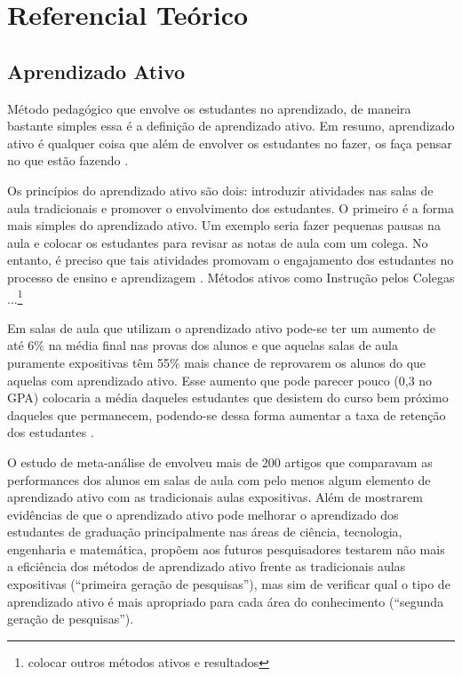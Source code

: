 \chapter{Referencial Teórico}

\section{Aprendizado Ativo}
Método pedagógico que envolve os estudantes no aprendizado, de maneira bastante simples
essa é a definição de aprendizado ativo. Em resumo, aprendizado ativo é qualquer coisa
que além de envolver os estudantes no fazer, os faça pensar no que estão fazendo \cite[p. 19]{Charles1991}.

Os princípios do aprendizado ativo são dois: introduzir atividades nas salas de aula
tradicionais e promover o envolvimento dos estudantes. O primeiro é a forma
mais simples do aprendizado ativo. Um exemplo seria fazer pequenas pausas na aula
e colocar os estudantes para revisar as notas de aula com um colega. No entanto,
é preciso que tais atividades promovam o engajamento dos estudantes no processo
de ensino e aprendizagem \cite[p. 3]{Prince2004}. Métodos ativos como Instrução
pelos Colegas \cite{} ...\footnote{colocar outros métodos ativos e resultados}

Em salas de aula que utilizam o aprendizado ativo pode-se ter um aumento de até 6\%
na média final nas provas dos alunos e que aquelas salas de aula puramente expositivas
têm 55\% mais chance de reprovarem os alunos do que aquelas com aprendizado ativo.
Esse aumento que pode parecer pouco (0,3 no GPA) colocaria a média daqueles estudantes
que desistem do curso bem próximo daqueles que permanecem, podendo-se dessa forma aumentar
a taxa de retenção dos estudantes \cite[p. 4]{Freeman2014}.

O estudo de meta-análise de  envolveu mais de 200 artigos
que comparavam as performances dos alunos em salas de aula com pelo menos algum
elemento de aprendizado ativo com as tradicionais aulas expositivas. Além de
mostrarem evidências de que o aprendizado ativo pode melhorar o aprendizado dos
estudantes de graduação principalmente nas áreas de ciência, tecnologia, engenharia
e matemática,  propõem aos futuros pesquisadores
testarem não mais a eficiência dos métodos de aprendizado ativo frente as tradicionais
aulas expositivas (``primeira geração de pesquisas''), mas sim de verificar qual
o tipo de aprendizado ativo é mais apropriado para cada área do conhecimento
(``segunda geração de pesquisas'').

